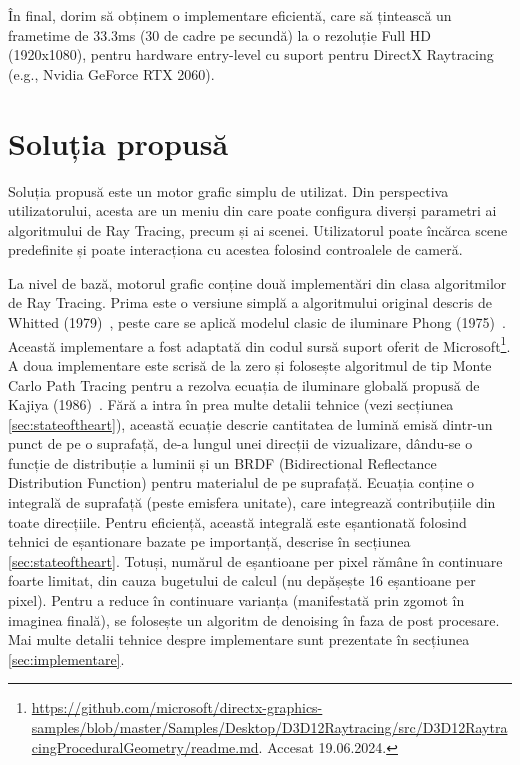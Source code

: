 \documentclass[12pt,a4paper]{report}
\numberwithin{equation}{section} %
\begin{document}
În final, dorim să obținem o implementare eficientă, care să țintească un frametime de 33.3ms
(30 de cadre pe secundă) la o rezoluție Full HD (1920x1080), pentru hardware entry-level cu suport pentru
DirectX Raytracing (e.g., Nvidia GeForce RTX 2060).

\subsubsection*{}

\section{Soluția propusă}
Soluția propusă este un motor grafic simplu de utilizat. Din perspectiva utilizatorului,
acesta are un meniu din care poate configura diverși parametri ai algoritmului
de Ray Tracing, precum și ai scenei. Utilizatorul poate încărca scene predefinite
și poate interacționa cu acestea folosind controalele de cameră.

La nivel de bază, motorul grafic conține două implementări din clasa algoritmilor
de Ray Tracing. Prima este o versiune simplă a algoritmului original descris de
Whitted (1979)~\cite{Whitted}, peste care se aplică modelul clasic de iluminare
Phong (1975)~\cite{Phong}. Această implementare a fost adaptată din codul sursă
suport oferit de Microsoft\footnote{\url{https://github.com/microsoft/directx-graphics-samples/blob/master/Samples/Desktop/D3D12Raytracing/src/D3D12RaytracingProceduralGeometry/readme.md}. Accesat 19.06.2024.}.
A doua implementare este scrisă de la zero și folosește algoritmul de tip Monte Carlo
Path Tracing pentru a rezolva ecuația de iluminare globală propusă de Kajiya (1986)~\cite{Kajiya}.
Fără a intra în prea multe detalii tehnice (vezi secțiunea \ref{sec:stateoftheart}),
această ecuație descrie cantitatea de lumină emisă dintr-un punct de pe o suprafață,
de-a lungul unei direcții de vizualizare, dându-se o funcție de distribuție a luminii
și un BRDF (Bidirectional Reflectance Distribution Function) pentru materialul de pe
suprafață. Ecuația conține o integrală de suprafață (peste emisfera unitate), care
integrează contribuțiile din toate direcțiile. Pentru eficiență, această integrală
este eșantionată folosind tehnici de eșantionare bazate pe importanță, descrise în secțiunea \ref{sec:stateoftheart}.
Totuși, numărul de eșantioane per pixel rămâne în continuare foarte limitat, din
cauza bugetului de calcul (nu depășește 16 eșantioane per pixel). Pentru a reduce
în continuare varianța (manifestată prin zgomot în imaginea finală), se folosește
un algoritm de denoising în faza de post procesare. Mai multe detalii tehnice
despre implementare sunt prezentate în secțiunea \ref{sec:implementare}.
\end{document}
